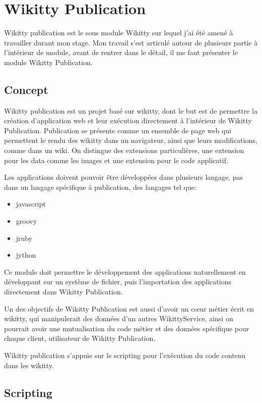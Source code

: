 \section{Wikitty Publication}

Wikitty publication est le sous module Wikitty sur lequel j'ai été amené à 
travailler durant mon stage. Mon travail s'est articulé autour de plusieurs
partie à l'intérieur de module, avant de rentrer dans le détail, il me faut 
présenter le module Wikitty Publication.

\subsection{Concept}

Wikitty publication est un projet basé sur wikitty, dont le but est de permettre
la création d'application web et leur exécution directement à l'intérieur de
Wikitty Publication. Publication se présente comme un ensemble de page web qui 
permettent le rendu des wikitty dans un navigateur, ainsi que leurs modifications,
comme dans un wiki. On distingue des extensions particulières, une extension
pour les data comme les images et une extension pour le code applicatif.

Les applications doivent pouvoir être développées dans plusieurs langage, pas 
dans un langage spécifique à publication, des langages tel que:
\begin{itemize}
\item javascript
\item groovy
\item jruby
\item jython
\end{itemize}

Ce module doit permettre le développement des applications naturellement 
en développant sur un système de fichier, puis l'importation des applications
directement dans Wikitty Publication.

Un des objectifs de Wikitty Publication est aussi d'avoir un cœur métier 
écrit en wikitty, qui manipulerait des données d'un autres WikittyService, ainsi on
pourrait avoir une mutualisation du code métier et des données spécifique 
pour chaque client, utilisateur de Wikitty Publication.

Wikitty publication s'appuie sur le scripting pour l'exécution du code contenu 
dans les wikitty.


\subsection{Scripting}

